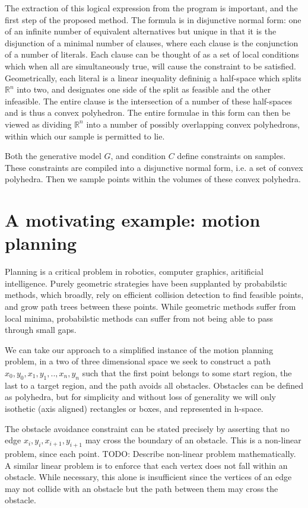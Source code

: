The extraction of this logical expression from the program is important, and the first step of the proposed method.
The formula is in disjunctive normal form: one of an infinite number of equivalent alternatives but unique in that it is the disjunction of a minimal number of clauses, where each clause is the conjunction of a number of literals.
Each clause can be thought of as a set of local conditions which when all are simultaneously true, will cause the constraint to be satisfied.
Geometrically, each literal is a linear inequality defininig a half-space which splits $\mathbb{R}^n$ into two, and designates one side of the split as feasible and the other infeasible.
The entire clause is the intersection of a number of these half-spaces and is thus a convex polyhedron.
The entire formulae in this form can then be viewed as dividing $\mathbb{R}^n$ into a number of possibly overlapping convex polyhedrons, within which our sample is permitted to lie.

Both the generative model $G$, and condition $C$ define constraints on samples.
These constraints are compiled into a disjunctive normal form, i.e. a set of convex polyhedra.
Then we sample points within the volumes of these convex polyhedra.

\section{A motivating example: motion planning}
Planning is a critical problem in robotics, computer graphics, aritificial intelligence.
Purely geometric strategies have been supplanted by probabilstic methods, which broadly, rely on efficient collision detection to find feasible points, and grow path trees between these points.
While geometric methods suffer from local minima, probabilstic methods can suffer from not being able to pass through small gaps.

We can take our approach to a simplified instance of the motion planning problem, in a two of three dimensional space we seek to construct a path ${x_0,y_0,x_1,y_1,..,x_n,y_n}$ such that the first point belongs to some start region, the last to a target region, and the path avoids all obstacles.
Obstacles can be defined as polyhedra, but for simplicity and without loss of generality we will only isothetic (axis aligned) rectangles or boxes, and represented in h-space.

The obstacle avoidance constraint can be stated precisely by asserting that no edge $x_i,y_i,x_{i+1},y_{i+1}$ may cross the boundary of an obstacle.
This is a non-linear problem, since each point. TODO: Describe non-linear problem mathematically.
A similar linear problem is to enforce that each vertex does not fall within an obstacle.
While necessary, this alone is insufficient since the vertices of an edge may not collide with an obstacle but the path between them may cross the obstacle.

